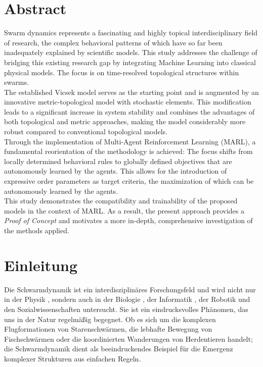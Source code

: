 \documentclass{solutionclass}
\begin{document}
\section*{Abstract}

Swarm dynamics represents a fascinating and highly topical interdisciplinary field of research, the complex behavioral patterns of which have so far been inadequately explained by scientific models. This study addresses the challenge of bridging this existing research gap by integrating Machine Learning into classical physical models. The focus is on time-resolved topological structures within swarms.\\

The established Vicsek model serves as the starting point and is augmented by an innovative metric-topological model with stochastic elements. This modification leads to a significant increase in system stability and combines the advantages of both topological and metric approaches, making the model considerably more robust compared to conventional topological models.\\

Through the implementation of Multi-Agent Reinforcement Learning (MARL), a fundamental reorientation of the methodology is achieved: The focus shifts from locally determined behavioral rules to globally defined objectives that are autonomously learned by the agents. This allows for the introduction of expressive order parameters as target criteria, the maximization of which can be autonomously learned by the agents.\\

This study demonstrates the compatibility and trainability of the proposed models in the context of MARL. As a result, the present approach provides a \textit{Proof of Concept} and motivates a more in-depth, comprehensive investigation of the methods applied.

\newpage

\tableofcontents

\newpage
\setcounter{page}{1}
\section{Einleitung}
Die Schwarmdynamik ist ein interdisziplinäres Forschungsfeld und wird nicht nur in der Physik \cite{vicsek1995, cuckerSmale2007, PhaseTransitions2013, TopologicalFlockingModels2021, Aldana_2007}, sondern auch in der Biologie \cite{EvolutionaryDynamicsGroup2013, InferringIndividualRules2010, FluidDynamicsBacteria2007}, der Informatik \cite{SchwarmInformatikStatisticalMechanics2001}, der Robotik \cite{AerialSwarmRobotics, RoboticSwarmInformation2019} und den Sozialwissenschaften \cite{AlettiSociodynamics2010} untersucht. Sie ist ein eindrucksvolles Phänomen, das uns in der Natur regelmäßig begegnet. Ob es sich um die komplexen Flugformationen von Starenschwärmen, die lebhafte Bewegung von Fischschwärmen oder die koordinierten Wanderungen von Herdentieren handelt; die Schwarmdynamik dient als beeindruckendes Beispiel für die Emergenz komplexer Strukturen aus einfachen Regeln.\\
\end{document}
